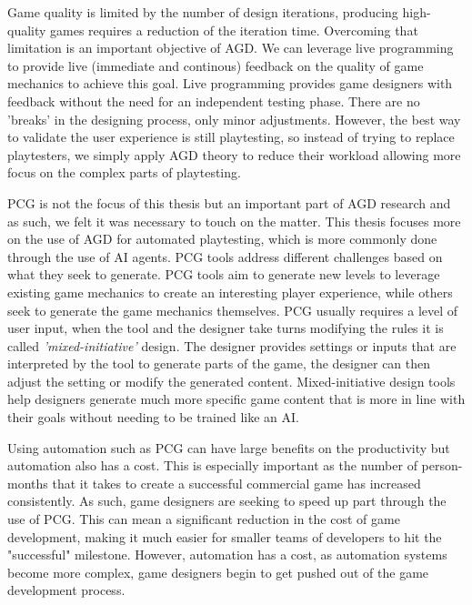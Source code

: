 Game quality is limited by the number of design iterations, producing high-quality games requires a reduction of the iteration time. Overcoming that limitation is an important objective of AGD. We can leverage live programming to provide live (immediate and continous) feedback on the quality of game mechanics to achieve this goal. Live programming provides game designers with feedback without the need for an independent testing phase. There are no 'breaks' in the designing process, only minor adjustments\cite{10.1145/3412843}. However, the best way to validate the user experience is still playtesting, so instead of trying to replace playtesters, we simply apply AGD theory to reduce their workload allowing more focus on the complex parts of playtesting.

PCG is not the focus of this thesis but an important part of AGD research and as such, we felt it was necessary to touch on the matter. This thesis focuses more on the use of AGD for automated playtesting, which is more commonly done through the use of AI agents. PCG tools address different challenges based on what they seek to generate. PCG tools aim to generate new levels to leverage existing game mechanics to create an interesting player experience, while others seek to generate the game mechanics themselves. PCG usually requires a level of user input, when the tool and the designer take turns modifying the rules it is called \emph{'mixed-initiative'} design\cite{DBLP:conf/chi/Smith14}. The designer provides settings or inputs that are interpreted by the tool to generate parts of the game, the designer can then adjust the setting or modify the generated content. Mixed-initiative design tools help designers generate much more specific game content that is more in line with their goals without needing to be trained like an AI. 


Using automation such as PCG can have large benefits on the productivity but automation also has a cost. This is especially important as the number of person-months that it takes to create a successful commercial game has increased consistently\cite{shaker2016procedural}. As such, game designers are seeking to speed up part through the use of PCG. This can mean a significant reduction in the cost of game development, making it much easier for smaller teams of developers to hit the "successful" milestone. However, automation has a cost, as automation systems become more complex, game designers begin to get pushed out of the game development process.

